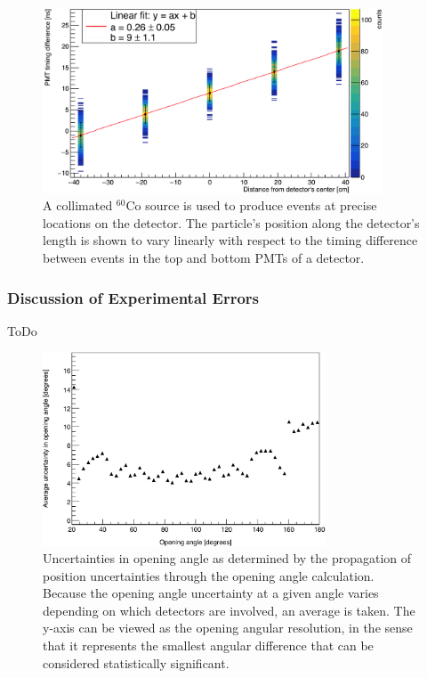 \begin{figure}
    \centering
    \includegraphics[width = 0.9\textwidth]{Content/Methods/PMTDifference.png}
    \caption{A collimated $^{60}$Co source is used to produce events at precise locations on the detector.
    The particle's position along the detector's length is shown to vary linearly with respect to the timing difference between events in the top and bottom PMTs of a detector.}
    \label{fig:PMTDifference}
\end{figure}
\subsubsection{Discussion of Experimental Errors}
\label{Errors}
ToDo
\begin{figure}[h]
    \centering
    \includegraphics[width = 0.75\textwidth]{Content/Methods/OpeningAngleUncertainty.png}
    \caption{Uncertainties in opening angle as determined by the propagation of position uncertainties through the  opening angle calculation.
    Because the opening angle uncertainty at a given angle varies depending on which detectors are involved, an average is taken.
    The y-axis can be viewed as the opening angular resolution, in the sense that it represents the smallest angular difference that can be considered statistically significant.
    }
    \label{fig:CrossTalkExamplepng}
\end{figure}

